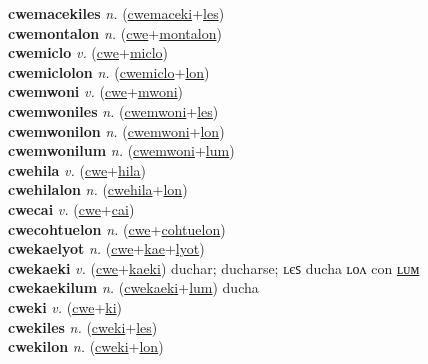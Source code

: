\textbf{cwemacekiles} \textit{n.} (\hyperref[cwemaceki]{cwemaceki}+\hyperref[les]{les})
 \label{cwemacekiles} \\
\textbf{cwemontalon} \textit{n.} (\hyperref[cwe]{cwe}+\hyperref[montalon]{montalon})
 \label{cwemontalon} \\
\textbf{cwemiclo} \textit{v.} (\hyperref[cwe]{cwe}+\hyperref[miclo]{miclo})
 \label{cwemiclo} \\
\textbf{cwemiclolon} \textit{n.} (\hyperref[cwemiclo]{cwemiclo}+\hyperref[lon]{lon})
 \label{cwemiclolon} \\
\textbf{cwemwoni} \textit{v.} (\hyperref[cwe]{cwe}+\hyperref[mwoni]{mwoni})
 \label{cwemwoni} \\
\textbf{cwemwoniles} \textit{n.} (\hyperref[cwemwoni]{cwemwoni}+\hyperref[les]{les})
 \label{cwemwoniles} \\
\textbf{cwemwonilon} \textit{n.} (\hyperref[cwemwoni]{cwemwoni}+\hyperref[lon]{lon})
 \label{cwemwonilon} \\
\textbf{cwemwonilum} \textit{n.} (\hyperref[cwemwoni]{cwemwoni}+\hyperref[lum]{lum})
 \label{cwemwonilum} \\
\textbf{cwehila} \textit{v.} (\hyperref[cwe]{cwe}+\hyperref[hila]{hila})
 \label{cwehila} \\
\textbf{cwehilalon} \textit{n.} (\hyperref[cwehila]{cwehila}+\hyperref[lon]{lon})
 \label{cwehilalon} \\
\textbf{cwecai} \textit{v.} (\hyperref[cwe]{cwe}+\hyperref[cai]{cai})
 \label{cwecai} \\
\textbf{cwecohtuelon} \textit{n.} (\hyperref[cwe]{cwe}+\hyperref[cohtuelon]{cohtuelon})
 \label{cwecohtuelon} \\
\textbf{cwekaelyot} \textit{n.} (\hyperref[cwe]{cwe}+\hyperref[kae]{kae}+\hyperref[lyot]{lyot})
 \label{cwekaelyot} \\
\textbf{cwekaeki} \textit{v.} (\hyperref[cwe]{cwe}+\hyperref[kaeki]{kaeki})
duchar; ducharse; ʟєꜱ ducha ʟᴏᴧ con \hyperref[cwekaekilum]{ʟᴜᴍ} \label{cwekaeki} \\
\textbf{cwekaekilum} \textit{n.} (\hyperref[cwekaeki]{cwekaeki}+\hyperref[lum]{lum})
ducha \label{cwekaekilum} \\
\textbf{cweki} \textit{v.} (\hyperref[cwe]{cwe}+\hyperref[ki]{ki})
 \label{cweki} \\
\textbf{cwekiles} \textit{n.} (\hyperref[cweki]{cweki}+\hyperref[les]{les})
 \label{cwekiles} \\
\textbf{cwekilon} \textit{n.} (\hyperref[cweki]{cweki}+\hyperref[lon]{lon})
 \label{cwekilon} \\
